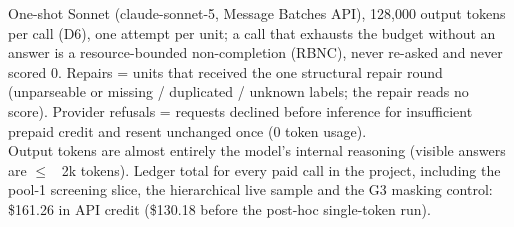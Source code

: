 \begin{table}[tp]
\centering
\footnotesize
\setlength{\tabcolsep}{3pt}
\caption{Completion, non-completion, repairs and cost of every paid experiment.}
\label{tab:resources}
\ifdim\wd0>\textwidth\resizebox{\textwidth}{!}{\usebox0}\else\usebox0\fi
\begin{flushleft}\footnotesize
One-shot Sonnet (claude-sonnet-5, Message Batches API), 128,000 output tokens per call (D6), one attempt per unit; a call that exhausts the budget without an answer is a resource-bounded non-completion (RBNC), never re-asked and never scored 0. Repairs = units that received the one structural repair round (unparseable or missing / duplicated / unknown labels; the repair reads no score). Provider refusals = requests declined before inference for insufficient prepaid credit and resent unchanged once (0 token usage).\\
Output tokens are almost entirely the model's internal reasoning (visible answers are $\leq$ ~2k tokens). Ledger total for every paid call in the project, including the pool-1 screening slice, the hierarchical live sample and the G3 masking control: \$161.26 in API credit (\$130.18 before the post-hoc single-token run).\\
\end{flushleft}
\end{table}
